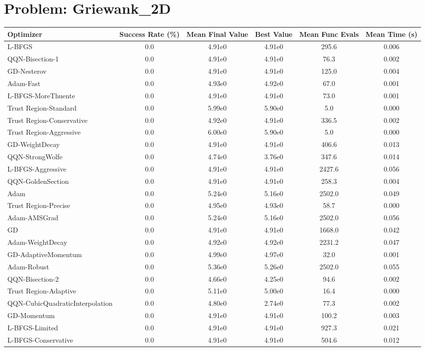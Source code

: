 \documentclass{article}
\begin{document}
\section{Problem: Griewank\_2D}
\begin{longtable}{p{3cm}*{5}{c}}
\toprule
\textbf{Optimizer} & \textbf{Success Rate (\%)} & \textbf{Mean Final Value} & \textbf{Best Value} & \textbf{Mean Func Evals} & \textbf{Mean Time (s)} \\
\midrule
L-BFGS & 0.0 & 4.91e0 & 4.91e0 & 295.6 & 0.006 \\
QQN-Bisection-1 & 0.0 & 4.91e0 & 4.91e0 & 76.3 & 0.002 \\
GD-Nesterov & 0.0 & 4.91e0 & 4.91e0 & 125.0 & 0.004 \\
Adam-Fast & 0.0 & 4.93e0 & 4.92e0 & 67.0 & 0.001 \\
L-BFGS-MoreThuente & 0.0 & 4.91e0 & 4.91e0 & 73.0 & 0.001 \\
Trust Region-Standard & 0.0 & 5.99e0 & 5.90e0 & 5.0 & 0.000 \\
Trust Region-Conservative & 0.0 & 4.92e0 & 4.91e0 & 336.5 & 0.002 \\
Trust Region-Aggressive & 0.0 & 6.00e0 & 5.90e0 & 5.0 & 0.000 \\
GD-WeightDecay & 0.0 & 4.91e0 & 4.91e0 & 406.6 & 0.013 \\
QQN-StrongWolfe & 0.0 & 4.74e0 & 3.76e0 & 347.6 & 0.014 \\
L-BFGS-Aggressive & 0.0 & 4.91e0 & 4.91e0 & 2427.6 & 0.056 \\
QQN-GoldenSection & 0.0 & 4.91e0 & 4.91e0 & 258.3 & 0.004 \\
Adam & 0.0 & 5.24e0 & 5.16e0 & 2502.0 & 0.049 \\
Trust Region-Precise & 0.0 & 4.95e0 & 4.93e0 & 58.7 & 0.000 \\
Adam-AMSGrad & 0.0 & 5.24e0 & 5.16e0 & 2502.0 & 0.056 \\
GD & 0.0 & 4.91e0 & 4.91e0 & 1668.0 & 0.042 \\
Adam-WeightDecay & 0.0 & 4.92e0 & 4.92e0 & 2231.2 & 0.047 \\
GD-AdaptiveMomentum & 0.0 & 4.99e0 & 4.97e0 & 32.0 & 0.001 \\
Adam-Robust & 0.0 & 5.36e0 & 5.26e0 & 2502.0 & 0.055 \\
QQN-Bisection-2 & 0.0 & 4.66e0 & 4.25e0 & 94.6 & 0.002 \\
Trust Region-Adaptive & 0.0 & 5.11e0 & 5.00e0 & 16.4 & 0.000 \\
QQN-CubicQuadraticInterpolation & 0.0 & 4.80e0 & 2.74e0 & 77.3 & 0.002 \\
GD-Momentum & 0.0 & 4.91e0 & 4.91e0 & 100.2 & 0.003 \\
L-BFGS-Limited & 0.0 & 4.91e0 & 4.91e0 & 927.3 & 0.021 \\
L-BFGS-Conservative & 0.0 & 4.91e0 & 4.91e0 & 504.6 & 0.012 \\
\bottomrule
\end{longtable}
\end{document}
